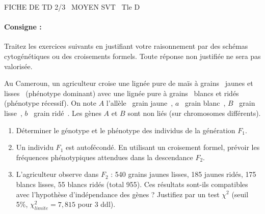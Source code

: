 \documentclass[11pt]{article}
\begin{document}
\begin{tcolorbox}[enhanced,colback=popink,colframe=popink,arc=10pt,boxrule=0pt,left=12pt,right=12pt,top=9pt,bottom=9pt]
{\color{white}\popxbold\small FICHE DE TD 2/3 \textbullet\ MOYEN \hfill SVT \textbullet\ Tle D\par}
\end{tcolorbox}
\vspace{4pt}
\paragraph{Consigne :} Traitez les exercices suivants en justifiant votre raisonnement par des schémas cytogénétiques ou des croisements formels. Toute réponse non justifiée ne sera pas valorisée.

\begin{exercice}
Au Cameroun, un agriculteur croise une lignée pure de maïs à grains \og~jaunes et lisses~{} (phénotype dominant) avec une lignée pure à grains \og~blancs et ridés~{} (phénotype récessif). 
On note $A$ l'allèle \og~grain jaune~{}, $a$ \og~grain blanc~{}, $B$ \og~grain lisse~{}, $b$ \og~grain ridé~{}.
Les gènes $A$ et $B$ sont non liés (sur chromosomes différents).
\begin{enumerate}
    \item Déterminer le génotype et le phénotype des individus de la génération $F_1$.
    \item Un individu $F_1$ est autofécondé. En utilisant un croisement formel, prévoir les fréquences phénotypiques attendues dans la descendance $F_2$.
    \item L'agriculteur observe dans $F_2$ : 540 grains jaunes lisses, 185 jaunes ridés, 175 blancs lisses, 55 blancs ridés (total 955). Ces résultats sont-ils compatibles avec l'hypothèse d'indépendance des gènes ? Justifiez par un test $\chi^2$ (seuil 5\%, $\chi^2_{limite}=7,815$ pour 3 ddl).
\end{enumerate}
\end{exercice}
\end{document}
